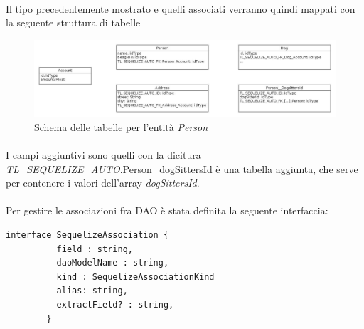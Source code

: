 \documentclass[a4paper, 12pt]{report}
\begin{document}
      \paragraph*{}
      Il tipo precedentemente mostrato e quelli associati verranno quindi mappati con la seguente struttura di tabelle
      \begin{figure}[H]
        \includegraphics[width=\textwidth]{db-example.jpg}
        \caption{Schema delle tabelle per l'entità \emph{Person}}
      \end{figure}
      \paragraph*{}
      I campi aggiuntivi sono quelli con la dicitura \emph{TL_SEQUELIZE_AUTO}.Person_dogSittersId è una tabella aggiunta, che serve per contenere i valori dell'array \emph{dogSittersId}.
      \paragraph*{}
      Per gestire le associazioni fra DAO è stata definita la seguente interfaccia:
      \begin{Verbatim}[samepage=true]
        interface SequelizeAssociation {
          field : string,
          daoModelName : string,
          kind : SequelizeAssociationKind
          alias: string,
          extractField? : string,
        }
      \end{Verbatim}
\end{document}

